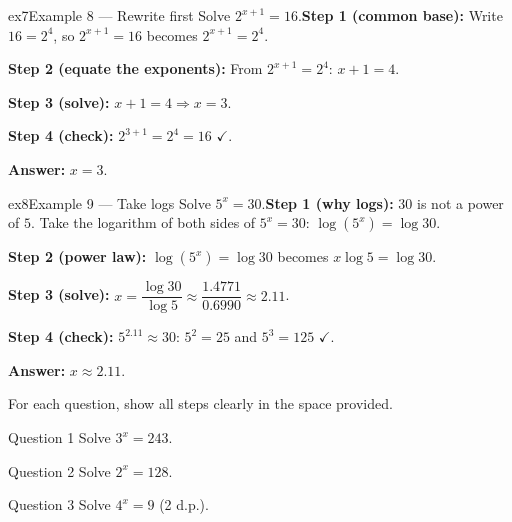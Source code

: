 \documentclass[11pt]{article}
\begin{document}
\begin{example}{ex7}{Example 8 --- Rewrite first}
Solve $2^{x+1}=16$.\soln \textbf{Step 1 (common base):} Write $16=2^4$, so $2^{x+1}=16$ becomes $2^{x+1}=2^4$.

\textbf{Step 2 (equate the exponents):} From $2^{x+1}=2^4$: $x+1=4$.

\textbf{Step 3 (solve):} $x+1=4\Rightarrow x=3$.

\textbf{Step 4 (check):} $2^{3+1}=2^4=16$ $\checkmark$.

\textbf{Answer:} $x=3$.

\end{example}

\begin{example}{ex8}{Example 9 --- Take logs}
Solve $5^x=30$.\soln \textbf{Step 1 (why logs):} $30$ is not a power of $5$. Take the logarithm of both sides of $5^x=30$: $\log(5^x)=\log30$.

\textbf{Step 2 (power law):} $\log(5^x)=\log30$ becomes $x\log5=\log30$.

\textbf{Step 3 (solve):} $x=\dfrac{\log30}{\log5}\approx\dfrac{1.4771}{0.6990}\approx2.11$.

\textbf{Step 4 (check):} $5^{2.11}\approx30$: $5^2=25$ and $5^3=125$ $\checkmark$.

\textbf{Answer:} $x\approx2.11$.

\end{example}

\clearpage
{}
For each question, show all steps clearly in the space provided.

\begin{qbox}{Question 1}
Solve $3^x=243$.\workspace{2.4cm}
\end{qbox}

\begin{qbox}{Question 2}
Solve $2^x=128$.\workspace{2.4cm}
\end{qbox}

\begin{qbox}{Question 3}
Solve $4^x=9$ (2 d.p.).\workspace{2.4cm}
\end{qbox}
\end{document}
